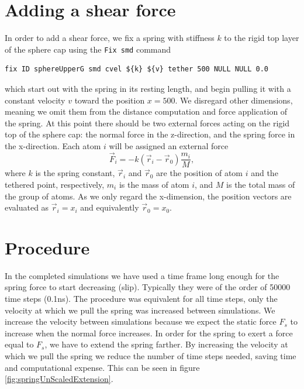 \documentclass[twoside,english]{uiofysmaster}
\begin{document}
\section{Adding a shear force}
In order to add a shear force, we fix a spring with stiffness $k$ to the rigid top layer of the sphere cap using the \texttt{Fix smd} command
 \begin{lstlisting}[language=LammpsInput, caption={LAMMPS command \texttt{Fix smd}, used to add a spring force to a group of atoms. The spring is considered fixed to the center of mass of the group and to a teatherd point, which we may move either with contant velocity of constant force.} ]
 fix ID sphereUpperG smd cvel ${k} ${v} tether 500 NULL NULL 0.0
 \end{lstlisting}
 which start out with the spring in its resting length, and begin pulling it with a constant velocity $v$ toward the position $x=500$. 
We disregard other dimensions, meaning we omit them from the distance computation and force application of the spring.
At this point there should be two external forces acting on the rigid top of the sphere cap: the normal force in the z-direction, and the spring force in the x-direction.
Each atom $i$ will be assigned an external force 
\begin{equation}
	\vec{F}_i = -k(\vec{r}_i- \vec{r}_0)\frac{m_i}{M},
\end{equation}
where $k$ is the spring constant, $\vec{r}_i$ and $\vec{r}_0$ are the position of atom $i$ and the tethered point, respectively, $m_i$ is the mass of atom $i$, and $M$ is the total mass of the group of atoms. 
As we only regard the x-dimension, the position vectors are evaluated as $\vec{r}_i=x_i$ and equivalently $\vec{r}_0 = x_0$.


\section{Procedure}
In the completed simulations we have used a time frame long enough for the spring force to start decreasing (slip). Typically they were of the order of 50000 time steps (0.1ns).
The procedure was equivalent for all time steps, only the velocity at which we pull the spring was increased between simulations. 
We increase the velocity between simulations because we expect the static force $F_s$ to increase when the normal force increases.
In order for the spring to exert a force equal to $F_s$, we have to extend the spring farther. 
By increasing the velocity at which we pull the spring we reduce the number of time steps needed, saving time and computational expense.
This can be seen in figure \ref{fig:springUnScaledExtension}.
\end{document}
